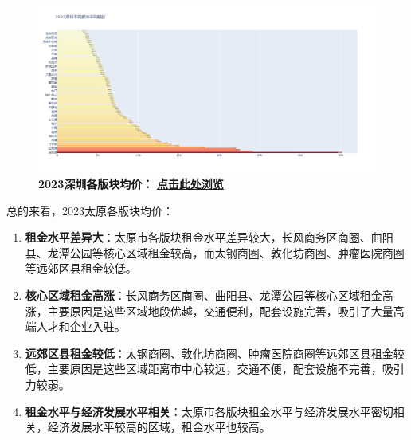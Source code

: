 \documentclass[lang=cn,11pt,a4paper]{elegantpaper}
\begin{document}
\begin{figure}[H]
    \centering
    \begin{minipage}{0.9\textwidth}
        \centering
        \includegraphics[width=\textwidth]{image/2023深圳各板块.png}
        \textbf{2023深圳各版块均价：} \href{https://yangchen-1318434888.cos.ap-beijing.myqcloud.com/images/2023%E6%B7%B1%E5%9C%B3%E4%B8%8D%E5%90%8C%E6%9D%BF%E5%9D%97%E5%B9%B3%E5%9D%87%E7%A7%9F%E4%BB%B7.html}{\textbf{点击此处浏览}}
    \end{minipage}
\end{figure}

总的来看，2023太原各版块均价：

\begin{enumerate}
    \item \textbf{租金水平差异大}：太原市各版块租金水平差异较大，长风商务区商圈、曲阳县、龙潭公园等核心区域租金较高，而太钢商圈、敦化坊商圈、肿瘤医院商圈等远郊区县租金较低。
    \item \textbf{核心区域租金高涨}：长风商务区商圈、曲阳县、龙潭公园等核心区域租金高涨，主要原因是这些区域地段优越，交通便利，配套设施完善，吸引了大量高端人才和企业入驻。
    \item \textbf{远郊区县租金较低}：太钢商圈、敦化坊商圈、肿瘤医院商圈等远郊区县租金较低，主要原因是这些区域距离市中心较远，交通不便，配套设施不完善，吸引力较弱。
    \item \textbf{租金水平与经济发展水平相关}：太原市各版块租金水平与经济发展水平密切相关，经济发展水平较高的区域，租金水平也较高。
\end{enumerate}
\end{document}
